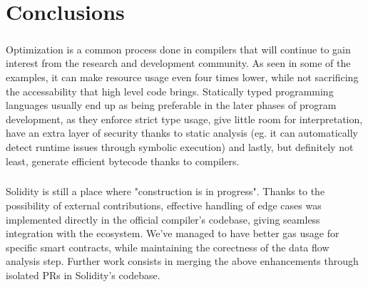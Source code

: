 \chapter{Conclusions} 

\paragraph*{}
Optimization is a common process done in compilers that will continue to gain interest from the research and development community. As seen in some of the examples, it can make resource usage even four times lower, while not sacrificing the accessability that high level code brings. Statically typed programming languages usually end up as being preferable in the later phases of program development, as they enforce strict type usage, give little room for interpretation, have an extra layer of security thanks to static analysis (eg. it can automatically detect runtime issues through symbolic execution) and lastly, but definitely not least, generate efficient bytecode thanks to compilers.

\paragraph*{}
Solidity is still a place where "construction is in progress". Thanks to the possibility of external contributions, effective handling of edge cases was implemented directly in the official compiler's codebase, giving seamless integration with the ecosystem. We've managed to have better gas usage for specific smart contracts, while maintaining the corectness of the data flow analysis step. Further work consists in merging the above enhancements through isolated PRs in Solidity's codebase.
